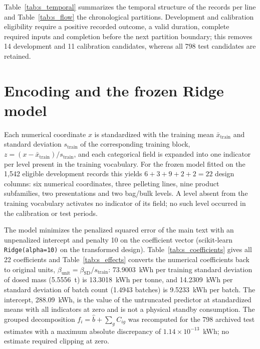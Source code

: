 \documentclass[11pt,a4paper]{article}
\begin{document}




Table~\ref{tab:s_temporal} summarizes the temporal structure of the records per line and Table~\ref{tab:s_flow} the chronological partitions. Development and calibration eligibility require a positive recorded outcome, a valid duration, complete required inputs and completion before the next partition boundary; this removes 14 development and 11 calibration candidates, whereas all 798 test candidates are retained.



\FloatBarrier

\section{Encoding and the frozen Ridge model}\label{sec:ridge}
Each numerical coordinate $x$ is standardized with the training mean $\bar x_{\mathrm{train}}$ and standard deviation $s_{\mathrm{train}}$ of the corresponding training block, $z=(x-\bar x_{\mathrm{train}})/s_{\mathrm{train}}$, and each categorical field is expanded into one indicator per level present in the training vocabulary. For the frozen model fitted on the 1,542 eligible development records this yields $6+3+9+2+2=22$ design columns: six numerical coordinates, three pelleting lines, nine product subfamilies, two presentations and two bag/bulk levels. A level absent from the training vocabulary activates no indicator of its field; no such level occurred in the calibration or test periods.

The model minimizes the penalized squared error of the main text with an unpenalized intercept and penalty 10 on the coefficient vector (scikit-learn \texttt{Ridge(alpha=10)} on the transformed design). Table~\ref{tab:s_coefficients} gives all 22 coefficients and Table~\ref{tab:s_effects} converts the numerical coefficients back to original units, $\beta_{\mathrm{unit}}=\beta_{\mathrm{SD}}/s_{\mathrm{train}}$: 73.9003~kWh per training standard deviation of dosed mass (5.5556~t) is 13.3018~kWh per tonne, and 14.2309~kWh per standard deviation of batch count (1.4943 batches) is 9.5233~kWh per batch. The intercept, 288.09~kWh, is the value of the untruncated predictor at standardized means with all indicators at zero and is not a physical standby consumption. The grouped decomposition $f_i=\widehat b+\sum_g C_{ig}$ was recomputed for the 798 archived test estimates with a maximum absolute discrepancy of $1.14\times10^{-13}$~kWh; no estimate required clipping at zero.
\end{document}
